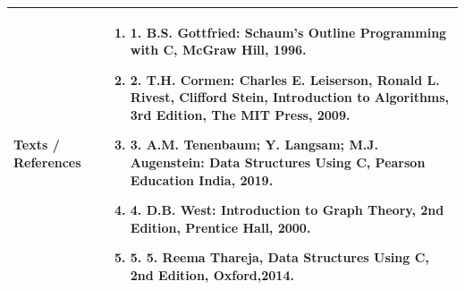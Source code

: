 \documentclass[11pt,a4paper]{article}
\begin{document}
\vspace{8pt}
\renewcommand{\arraystretch}{1.3}
\begin{tabularx}{\textwidth}{|p{3.2cm}|X|}
\hline
\textbf{Texts / References} & \begin{enumerate}[leftmargin=*,noitemsep,topsep=2pt]  \item 1. B.S. Gottfried: Schaum's Outline Programming with C, McGraw Hill, 1996.  \item 2. T.H. Cormen: Charles E. Leiserson, Ronald L. Rivest, Clifford Stein, Introduction to  Algorithms, 3rd Edition, The MIT Press, 2009.  \item 3. A.M. Tenenbaum; Y. Langsam; M.J. Augenstein: Data Structures Using C, Pearson Education  India, 2019.  \item 4. D.B. West: Introduction to Graph Theory, 2nd Edition, Prentice Hall, 2000.  \item 5. 5. Reema Thareja, Data Structures Using C, 2nd Edition, Oxford,2014.\end{enumerate} \\
\hline
\end{tabularx}
\clearpage
\end{document}
